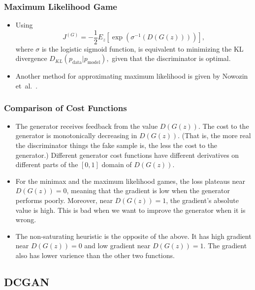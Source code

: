 \documentclass[10pt]{article}
\newcommand{\etal}{{et~al.}}
\begin{document}
  \subsubsection{Maximum Likelihood Game}

  \begin{itemize}
    \item Using $$J^{(G)} = -\frac{1}{2} E_z [\exp(\sigma^{-1}(D(G(z))))],$$ where $\sigma$ is the logistic sigmoid function, is equivalent to minimizing the KL divergence $D_{KL}(p_{\mathrm{data}}|p_{\mathrm{model}}),$ given that the discriminator is optimal.

    \item Another method for approximating maximum likelihood is given by Nowozin \etal\ \cite{Nowozin:2016}.
  \end{itemize}

  \subsubsection{Comparison of Cost Functions}

  \begin{itemize}
    \item The generator receives feedback from the value $D(G(z))$. The cost to the generator is monotonically decreasing in $D(G(z))$. (That is, the more real the discriminator things the fake sample is, the less the cost to the generator.) Different generator cost functions have different derivatives on different parts of the $[0,1]$ domain of $D(G(z))$.

    \item For the minimax and the maximum likelihood games, the loss plateaus near $D(G(z)) = 0$, meaning that the gradient is low when the generator performs poorly. Moreover, near $D(G(z)) = 1$, the gradient's absolute value is high. This is bad when we want to improve the generator when it is wrong.

    \item The non-saturating heuristic is the opposite of the above. It has high gradient near $D(G(z)) = 0$ and low gradient near $D(G(z)) = 1$. The gradient also has lower varience than the other two functions.
  \end{itemize}

  \subsection{DCGAN}
\end{document}
